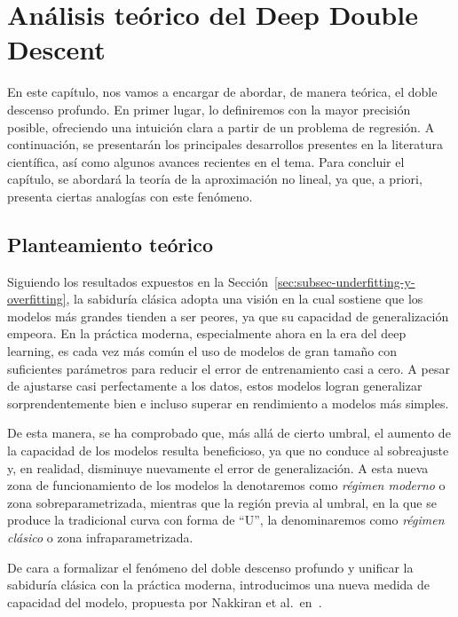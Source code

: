 
\chapter{Análisis teórico del Deep Double Descent}\label{ch:analisis-teorico-ddd}

En este capítulo, nos vamos a encargar de abordar, de manera teórica, el doble descenso profundo. En primer lugar, lo definiremos con la mayor precisión posible, ofreciendo una intuición clara a partir de un problema de regresión. A continuación, se presentarán los principales desarrollos presentes en la literatura científica, así como algunos avances recientes en el tema. Para concluir el capítulo, se abordará la teoría de la aproximación no lineal, ya que, a priori, presenta ciertas analogías con este fenómeno.\newline

\section{Planteamiento teórico}\label{sec:planteamiento-teorico}

Siguiendo los resultados expuestos en la Sección~\ref{sec:subsec-underfitting-y-overfitting}, la sabiduría clásica adopta una visión en la cual sostiene que los modelos más grandes tienden a ser peores, ya que su capacidad de generalización empeora. En la práctica moderna, especialmente ahora en la era del deep learning, es cada vez más común el uso de modelos de gran tamaño con suficientes parámetros para reducir el error de entrenamiento casi a cero. A pesar de ajustarse casi perfectamente a los datos, estos modelos logran generalizar sorprendentemente bien e incluso superar en rendimiento a modelos más simples.\newline

De esta manera, se ha comprobado que, más allá de cierto umbral, el aumento de la capacidad de los modelos resulta beneficioso, ya que no conduce al sobreajuste y, en realidad, disminuye nuevamente el error de generalización. A esta nueva zona de funcionamiento de los modelos la denotaremos como \emph{régimen moderno} o zona sobreparametrizada, mientras que la región previa al umbral, en la que se produce la tradicional curva con forma de ``U'', la denominaremos como \textit{régimen clásico} o zona infraparametrizada.\newline

De cara a formalizar el fenómeno del doble descenso profundo y unificar la sabiduría clásica con la práctica moderna, introducimos una nueva medida de capacidad del modelo, propuesta por Nakkiran et al.\ en~\cite{Nakkiran2019}.

